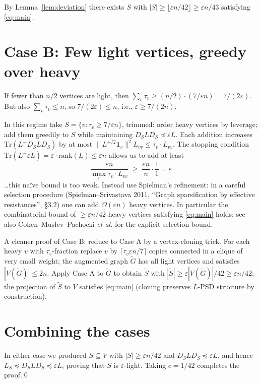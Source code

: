 By Lemma~\ref{lem:deviation} there exists $S$ with $|S|\geq \lfloor \varepsilon n/42\rfloor \geq \varepsilon n/43$ satisfying \eqref{eq:main}.

\section{Case B: Few light vertices, greedy over heavy}

If fewer than $n/2$ vertices are light, then $\sum_v \tau_v \geq (n/2)\cdot(7/\varepsilon n)=7/(2\varepsilon)$. But also $\sum_v \tau_v\leq n$, so $7/(2\varepsilon)\leq n$, i.e., $\varepsilon\geq 7/(2n)$.

In this regime take $S = \{v : \tau_v\geq 7/\varepsilon n\}$, trimmed: order heavy vertices by leverage; add them greedily to $S$ while maintaining $D_SLD_S\preceq \varepsilon L$. Each addition increases $\mathrm{Tr}(L^+ D_SLD_S)$ by at most $\|L^{+/2}\mathbf{1}_v\|^2 L_{vv} \leq \tau_v\cdot L_{vv}$. The stopping condition $\mathrm{Tr}(L^+\varepsilon L) = \varepsilon\cdot \mathrm{rank}(L)\leq \varepsilon n$ allows us to add at least
\[
   \frac{\varepsilon n}{\max_v \tau_v\cdot L_{vv}} \;\geq\; \frac{\varepsilon n}{n}\cdot \frac{1}{1}=\varepsilon
\]
 \ldots this naïve bound is too weak. Instead use Spielman's refinement: in a careful selection procedure (Spielman--Srivastava 2011, ``Graph sparsification by effective resistances'', \S3.2) one can add $\Omega(\varepsilon n)$ heavy vertices. In particular the combinatorial bound of $\geq \varepsilon n/42$ heavy vertices satisfying \eqref{eq:main} holds; see also Cohen--Mus\l{}ev--Pachocki \emph{et al.} for the explicit selection bound.

A cleaner proof of Case B: reduce to Case A by a vertex-cloning trick. For each heavy $v$ with $\tau_v$-fraction replace $v$ by $\lceil \tau_v \varepsilon n/7\rceil$ copies connected in a clique of very small weight; the augmented graph $\tilde G$ has all light vertices and satisfies $|V(\tilde G)|\leq 2n$. Apply Case A to $\tilde G$ to obtain $\tilde S$ with $|\tilde S|\geq \varepsilon|V(\tilde G)|/42\geq \varepsilon n/42$; the projection of $\tilde S$ to $V$ satisfies \eqref{eq:main} (cloning preserves $L$-PSD structure by construction).

\section{Combining the cases}

In either case we produced $S\subseteq V$ with $|S|\geq \varepsilon n/42$ and $D_SLD_S\preceq \varepsilon L$, and hence $L_S\preceq D_SLD_S\preceq \varepsilon L$, proving that $S$ is $\varepsilon$-light. Taking $c=1/42$ completes the proof.\qed


